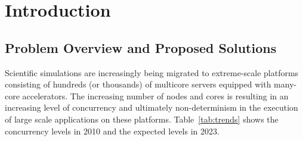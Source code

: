%
%
\chapter{Introduction}

\section{Problem Overview and Proposed Solutions}

Scientific simulations are increasingly being migrated to
extreme-scale platforms consisting of hundreds (or thousands) of
multicore servers equipped with many-core accelerators. The increasing
number of nodes and cores is resulting in an increasing level of
concurrency and ultimately non-determinism in the execution of large
scale applications on these platforms. Table~\ref{tab:trends} shows
the concurrency levels in 2010 and the expected levels in 2023. 


